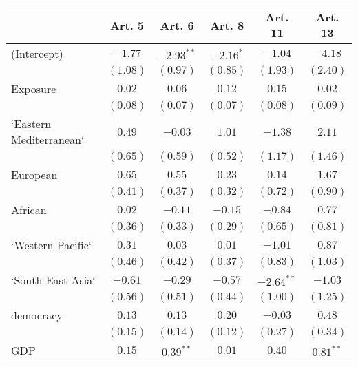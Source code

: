 
\begin{table}[!h]
\begin{center}
\begin{tabular}{l c c c c c }
\toprule
 & Art. 5 & Art. 6 & Art. 8 & Art. 11 & Art. 13 \\
\midrule
(Intercept)             & $-1.77$      & $-2.93^{**}$ & $-2.16^{*}$  & $-1.04$      & $-4.18$      \\
                        & $(1.08)$     & $(0.97)$     & $(0.85)$     & $(1.93)$     & $(2.40)$     \\
Exposure                & $0.02$       & $0.06$       & $0.12$       & $0.15$       & $0.02$       \\
                        & $(0.08)$     & $(0.07)$     & $(0.07)$     & $(0.08)$     & $(0.09)$     \\
`Eastern Mediterranean` & $0.49$       & $-0.03$      & $1.01$       & $-1.38$      & $2.11$       \\
                        & $(0.65)$     & $(0.59)$     & $(0.52)$     & $(1.17)$     & $(1.46)$     \\
European                & $0.65$       & $0.55$       & $0.23$       & $0.14$       & $1.67$       \\
                        & $(0.41)$     & $(0.37)$     & $(0.32)$     & $(0.72)$     & $(0.90)$     \\
African                 & $0.02$       & $-0.11$      & $-0.15$      & $-0.84$      & $0.77$       \\
                        & $(0.36)$     & $(0.33)$     & $(0.29)$     & $(0.65)$     & $(0.81)$     \\
`Western Pacific`       & $0.31$       & $0.03$       & $0.01$       & $-1.01$      & $0.87$       \\
                        & $(0.46)$     & $(0.42)$     & $(0.37)$     & $(0.83)$     & $(1.03)$     \\
`South-East Asia`       & $-0.61$      & $-0.29$      & $-0.57$      & $-2.64^{**}$ & $-1.03$      \\
                        & $(0.56)$     & $(0.51)$     & $(0.44)$     & $(1.00)$     & $(1.25)$     \\
democracy               & $0.13$       & $0.13$       & $0.20$       & $-0.03$      & $0.48$       \\
                        & $(0.15)$     & $(0.14)$     & $(0.12)$     & $(0.27)$     & $(0.34)$     \\
GDP                     & $0.15$       & $0.39^{**}$  & $0.01$       & $0.40$       & $0.81^{**}$  \\

\end{tabular}
\end{center}
\end{table}
